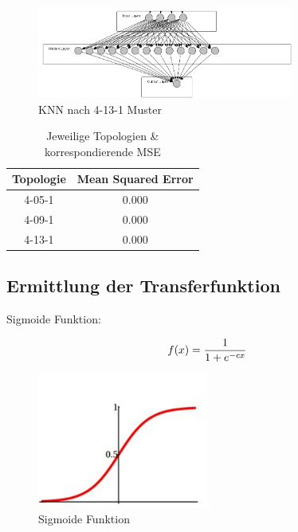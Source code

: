 \documentclass[a4paper,DIV11,bibliography=totoc,headings=normal,ngerman,headsepline,listof=totoc,parskip=half]{scrreprt}
\newcommand*{\formelentry}[1]{\addcontentsline{for}{formel}{\protect\numberline{Formel~\theequation} #1}}
\begin{document}
\begin{figure}[htbp]
\centering
		\includegraphics[width=0.75\textwidth]{4-13-1.PNG}
	\caption{KNN nach 4-13-1 Muster}
	\label{fig:KNN nach 4-13-1 Muster}
\end{figure}


\begin{table}
  \centering
  \begin{tabular}{|c|c|}
  \hline 
  \rule[0ex]{0pt}{2.5ex} Topologie & Mean Squared Error \\ 
  \hline 
  \rule[0ex]{0pt}{2.5ex} 4-05-1 & 0.000 \\ 
  \hline 
  \rule[0ex]{0pt}{2.5ex} 4-09-1 & 0.000 \\ 
  \hline 
  \rule[0ex]{0pt}{2.5ex} 4-13-1 & 0.000 \\ 
  \hline 
  \end{tabular} 
  \caption{Jeweilige Topologien \& korrespondierende MSE}
  \label{tab:myfirsttable}
\end{table}


\subsection{Ermittlung der Transferfunktion} %

Sigmoide Funktion:

\begin{equation}\formelentry{Sigmoide Funktion}
f(x)= \frac{1}{1+e^{-cx}}
\end{equation}

\begin{figure}[htbp]
\centering
		\includegraphics[width=0.5\textwidth]{Sigmoid.PNG}
	\caption{Sigmoide Funktion}
	\label{fig:Sigmoide Funktion}
\end{figure}
\end{document}

